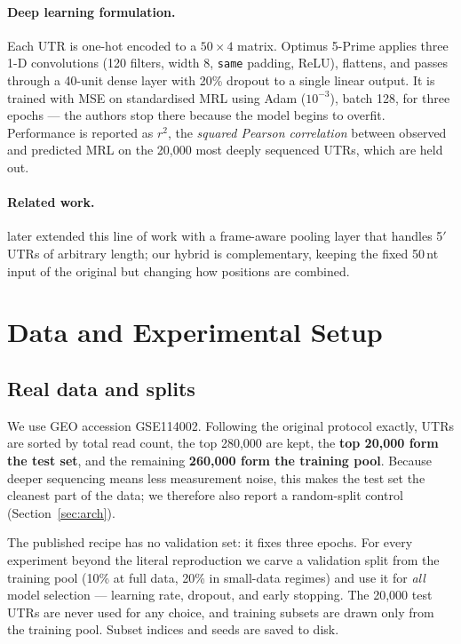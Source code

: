 \documentclass{article}
\begin{document}
\paragraph{Deep learning formulation.} Each UTR is one-hot encoded to a $50\times4$ matrix.
Optimus 5-Prime applies three 1-D convolutions (120 filters, width 8, \texttt{same} padding,
ReLU), flattens, and passes through a 40-unit dense layer with 20\% dropout to a single
linear output. It is trained with MSE on standardised MRL using Adam ($10^{-3}$), batch 128,
for three epochs --- the authors stop there because the model begins to overfit. Performance
is reported as $r^2$, the \emph{squared Pearson correlation} between observed and predicted
MRL on the 20{,}000 most deeply sequenced UTRs, which are held out.

\paragraph{Related work.} \citet{karollus2021} later extended this line of work with a
frame-aware pooling layer that handles 5$'$UTRs of arbitrary length; our hybrid is
complementary, keeping the fixed 50\,nt input of the original but changing how positions are
combined.

\section{Data and Experimental Setup}
\label{sec:data}

\subsection{Real data and splits}
We use GEO accession GSE114002. Following the original protocol exactly, UTRs are sorted by
total read count, the top 280{,}000 are kept, the \textbf{top 20{,}000 form the test set},
and the remaining \textbf{260{,}000 form the training pool}. Because deeper sequencing means
less measurement noise, this makes the test set the cleanest part of the data; we therefore
also report a random-split control (Section~\ref{sec:arch}).

The published recipe has no validation set: it fixes three epochs. For every experiment
beyond the literal reproduction we carve a validation split from the training pool
(10\% at full data, 20\% in small-data regimes) and use it for \emph{all} model selection ---
learning rate, dropout, and early stopping. The 20{,}000 test UTRs are never used for any
choice, and training subsets are drawn only from the training pool. Subset indices and seeds
are saved to disk.
\end{document}
